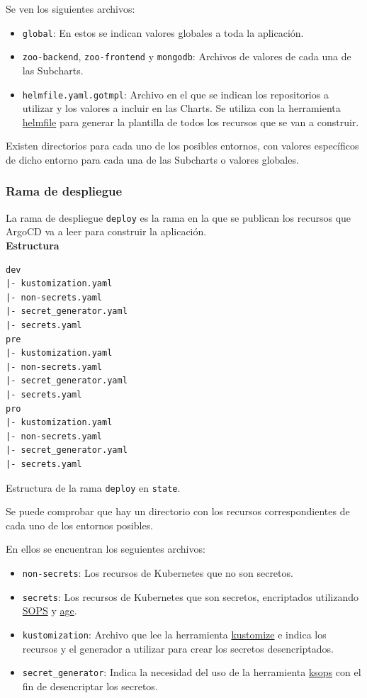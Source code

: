Se ven los siguientes archivos:
\begin{itemize}
  \item \texttt{global}: En estos se indican valores globales a toda la aplicación.
  \item \texttt{zoo-backend}, \texttt{zoo-frontend} y \texttt{mongodb}: Archivos de valores de cada una de las Subcharts.
  \item \texttt{helmfile.yaml.gotmpl}: Archivo en el que se indican los repositorios a utilizar y los valores a incluir en las Charts. Se utiliza con la herramienta \href{https://helmfile.readthedocs.io/en/latest/}{helmfile} para generar la plantilla de todos los recursos que se van a construir.
\end{itemize}

Existen directorios para cada uno de los posibles entornos, con valores específicos de dicho entorno para cada una de las Subcharts o valores globales.

\subsubsection*{Rama de despliegue}

La rama de despliegue \texttt{deploy} es la rama en la que se publican los recursos que ArgoCD va a leer para construir la aplicación.\\

\noindent\textbf{Estructura}

\begin{longlisting}
  \begin{verbatim}
dev
|- kustomization.yaml
|- non-secrets.yaml
|- secret_generator.yaml
|- secrets.yaml
pre
|- kustomization.yaml
|- non-secrets.yaml
|- secret_generator.yaml
|- secrets.yaml
pro
|- kustomization.yaml
|- non-secrets.yaml
|- secret_generator.yaml
|- secrets.yaml
  \end{verbatim}
  \caption{Estructura de la rama \texttt{deploy} en \texttt{state}.}
\end{longlisting}

Se puede comprobar que hay un directorio con los recursos correspondientes de cada uno de los entornos posibles.

En ellos se encuentran los seguientes archivos:

\begin{itemize}
  \item \texttt{non-secrets}: Los recursos de Kubernetes que no son secretos.
  \item \texttt{secrets}: Los recursos de Kubernetes que son secretos, encriptados utilizando \href{https://github.com/getsops/sops}{SOPS} y \href{https://github.com/FiloSottile/age}{age}.
  \item \texttt{kustomization}: Archivo que lee la herramienta \href{https://kustomize.io/}{kustomize} e indica los recursos y el generador a utilizar para crear los secretos desencriptados.
  \item \texttt{secret\_generator}: Indica la necesidad del uso de la herramienta \href{https://github.com/kubernetes/kops}{ksops} con el fin de desencriptar los secretos.
\end{itemize}
